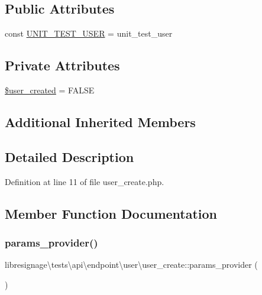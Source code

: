 \subsection*{Public Attributes}
\begin{DoxyCompactItemize}
\item 
const \hyperlink{classlibresignage_1_1tests_1_1api_1_1endpoint_1_1user_1_1user__create_a9d1139a13d9508e68b430f570f2f943f}{U\+N\+I\+T\+\_\+\+T\+E\+S\+T\+\_\+\+U\+S\+ER} = \textquotesingle{}unit\+\_\+test\+\_\+user\textquotesingle{}
\end{DoxyCompactItemize}
\subsection*{Private Attributes}
\begin{DoxyCompactItemize}
\item 
\hyperlink{classlibresignage_1_1tests_1_1api_1_1endpoint_1_1user_1_1user__create_acd574d952d843dea583fde54769d017d}{\$user\+\_\+created} = F\+A\+L\+SE
\end{DoxyCompactItemize}
\subsection*{Additional Inherited Members}


\subsection{Detailed Description}


Definition at line 11 of file user\+\_\+create.\+php.



\subsection{Member Function Documentation}
\mbox{\label{classlibresignage_1_1tests_1_1api_1_1endpoint_1_1user_1_1user__create_a8fc8662959cde03812fd4a0a7f7c331f}} 
\subsubsection{\texorpdfstring{params\+\_\+provider()}{params\_provider()}}
{\footnotesize\ttfamily libresignage\textbackslash{}tests\textbackslash{}api\textbackslash{}endpoint\textbackslash{}user\textbackslash{}user\+\_\+create\+::params\+\_\+provider (\begin{DoxyParamCaption}{ }\end{DoxyParamCaption})}




